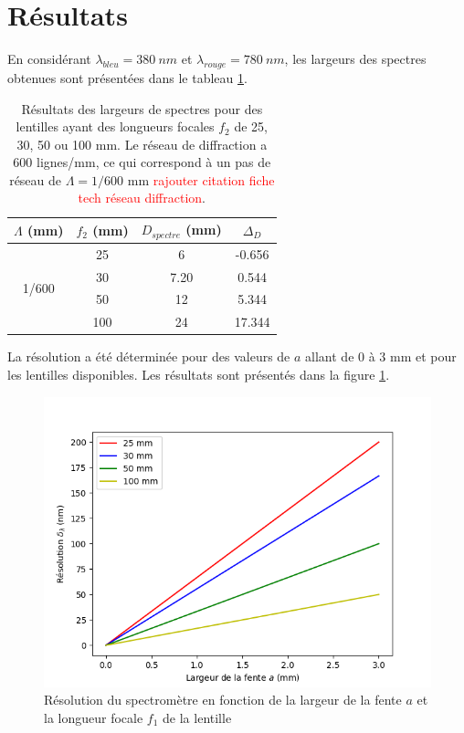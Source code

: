 \documentclass[conference]{IEEEtran}
\begin{document}
\section{Résultats \label{resultats}}
En considérant $\lambda_{bleu}=380\ nm$ et $\lambda_{rouge}=780\ nm$, les largeurs des spectres obtenues sont présentées
dans le tableau \ref{largeur_spectre}.
\begin{table}[H]
    \caption{Résultats des largeurs de spectres pour des lentilles ayant des longueurs focales
    $f_2$ de 25, 30, 50 ou 100 mm. Le réseau de diffraction a 600 lignes/mm, ce qui correspond à un pas de réseau
    de $\Lambda=1/600$ mm \textcolor{red}{rajouter citation fiche tech réseau diffraction}.}    
    \centering
    \begin{tabular}{c|c|c|c}
    $\Lambda$ (mm) & $f_2$ (mm) & $D_{spectre}$ (mm) & $\Delta_D$ \\
    \hline
    \hline
    \multirow{4}{*}{1/600} & 25 & 6 & -0.656 \\
    & 30 & 7.20 & 0.544 \\
    & 50 & 12 & 5.344 \\
    & 100 & 24 & 17.344\\
    \hline
    \end{tabular}
    \label{largeur_spectre}
  \end{table}
La résolution a été déterminée pour des valeurs de $a$ allant de 0 à 3 mm et pour les lentilles
disponibles. Les résultats sont présentés dans la figure \ref{res}.
\begin{figure}[H]
    \centering
    \includegraphics[scale=0.5]{Resolution.png}
    \caption{Résolution du spectromètre en fonction de la largeur de la fente $a$ et la longueur focale $f_1$
    de la lentille \label{res}}
\end{figure}
\end{document}
